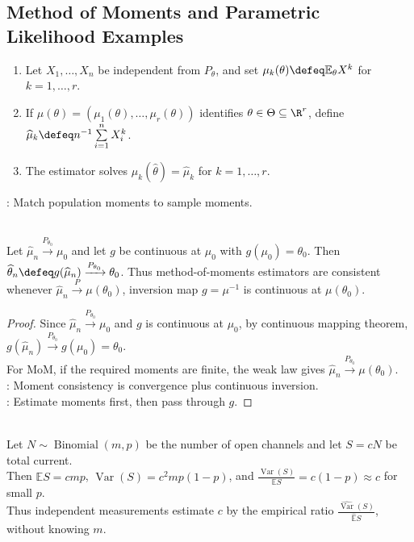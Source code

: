 \subsection{Method of Moments and Parametric Likelihood Examples}

\begin{method} \label{meth:method-of-moments} 
\begin{enumerate}[label=(\roman*)]
\setlength{\itemsep}{0pt}
\item Let $X_1,\ldots,X_n$ be independent from $P_\theta$, and set $\mu_k(\theta)\defeq\mathbb{E}_\theta X^k$ for $k=1,\ldots,r$.
\item If $\mu(\theta)=(\mu_1(\theta),\ldots,\mu_r(\theta))$ identifies $\theta\in\Theta\subseteq\R^r$, define $\widehat{\mu}_k\defeq n^{-1}\sum\limits_{i=1}^{n}X_i^k$.
\item The  estimator solves $\mu_k(\widehat{\theta})=\widehat{\mu}_k$ for $k=1,\ldots,r$.
\end{enumerate}
: Match population moments to sample moments.
\end{method}

\begin{proposition} \label{prop:method-of-moments-consistency} \\
Let $\widehat{\mu}_n\xrightarrow{P_{\theta_0}}\mu_0$ and let $g$ be continuous at $\mu_0$ with $g(\mu_0)=\theta_0$. Then $\widehat{\theta}_n\defeq g(\widehat{\mu}_n)\xrightarrow{P_{\theta_0}}\theta_0$. Thus method-of-moments estimators are consistent whenever $\widehat{\mu}_n\xrightarrow{P}\mu(\theta_0)$, inversion map $g=\mu^{-1}$ is continuous at $\mu(\theta_0)$.
\begin{proof} Since $\widehat{\mu}_n\xrightarrow{P_{\theta_0}}\mu_0$ and $g$ is continuous at $\mu_0$, by continuous mapping theorem, $g(\widehat{\mu}_n)\xrightarrow{P_{\theta_0}}g(\mu_0)=\theta_0$.\\
For MoM, if the required moments are finite, the weak law gives $\widehat{\mu}_n\xrightarrow{P_{\theta_0}}\mu(\theta_0)$.\\
: Moment consistency is convergence plus continuous inversion.\\
: Estimate moments first, then pass through $g$.
\end{proof}
\end{proposition}

\begin{example} \label{ex:ion-channel-current-moment-estimation} \\
Let $N\sim\operatorname{Binomial}(m,p)$ be the number of open channels and let $S=cN$ be total current.\\
Then $\mathbb{E}S=cmp$, $\operatorname{Var}(S)=c^2mp(1-p)$, and $\frac{\operatorname{Var}(S)}{\mathbb{E}S}=c(1-p)\approx c$ for small $p$.\\
Thus independent measurements estimate $c$ by the empirical ratio $\frac{\widehat{\operatorname{Var}}(S)}{\widehat{\mathbb{E}}S}$, without knowing $m$.
\end{example}

